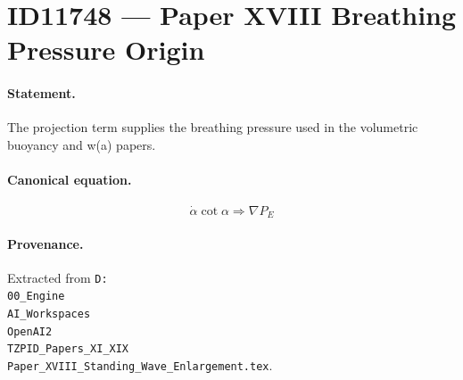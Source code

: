 \section*{ID11748 --- Paper XVIII Breathing Pressure Origin}

\paragraph{Statement.}
The projection term supplies the breathing pressure used in the volumetric buoyancy and w(a) papers.

\paragraph{Canonical equation.}
\[
\dot\alpha\cot\alpha\Rightarrow\nabla P_E
\]

\paragraph{Provenance.}
Extracted from \texttt{D:\\00\_Engine\\AI\_Workspaces\\OpenAI2\\TZPID\_Papers\_XI\_XIX\\Paper\_XVIII\_Standing\_Wave\_Enlargement.tex}.
